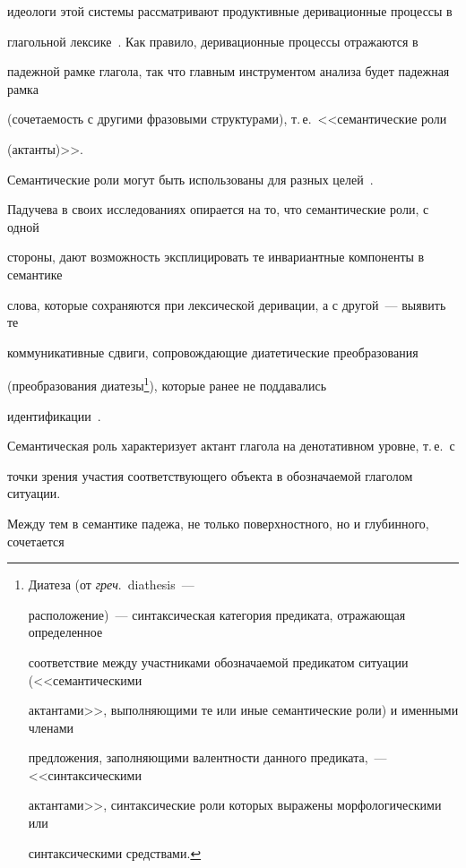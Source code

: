 идеологи этой системы рассматривают продуктивные деривационные процессы в 


глагольной лексике~\cite{7-2-11}. Как правило, деривационные процессы отражаются в 


падежной рамке глагола, так что главным инструментом анализа будет падежная рамка 


(сочетаемость с другими фразовыми структурами), т.\,е.\ <<семантические роли 


(актанты)>>.


   


   Семантические роли могут быть использованы для разных целей~\cite{5-2-11}. 


Падучева в своих исследованиях опирается на то, что семантические роли, с одной 


стороны, дают возможность эксплицировать те инвариантные компоненты в семантике 


слова, которые сохраняются при лексической деривации, а с другой~--- выявить те 


коммуникативные сдвиги, сопровождающие диатетические преобразования 


(преобразования диатезы\footnote{{Диатеза} (от \textit{греч}.\ diathesis~--- 


   расположение)~--- синтаксическая категория предиката, отражающая определенное 


соответствие между участниками обозначаемой предикатом ситуации (<<семантическими 


актантами>>, выполняющими те или иные семантические роли) и именными членами 


предложения, заполняющими валентности данного предиката,~--- <<синтаксическими 


актантами>>, синтаксические роли которых выражены морфологическими или 


синтаксическими средствами.}), которые ранее не поддавались 


   идентификации~\cite{5-2-11, 7-2-11}.


   


   Семантическая роль характеризует актант глагола на денотативном уровне, т.\,е.\ с 


точки зрения участия соответствующего объекта в обозначаемой глаголом ситуации. 


Между тем в семантике падежа, не только поверхностного, но и глубинного, сочетается 


